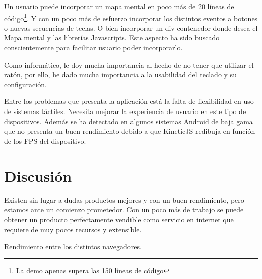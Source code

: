 Un usuario puede incorporar un mapa mental en poco más de 20 líneas de código\footnote{La demo apenas supera las 150 líneas de código}. Y con un poco más de esfuerzo incorporar los distintos eventos a botones o nuevas secuencias de teclas. O bien incorporar un div contenedor donde desea el Mapa mental y las librerías Javascripts. Este aspecto ha sido buscado conscientemente para facilitar usuario poder incorporarlo. 



Como informático, le doy mucha importancia al hecho de no tener que utilizar el ratón, por ello, he dado mucha importancia a la usabilidad del teclado y su configuración. 

Entre los problemas que presenta la aplicación está la falta de flexibilidad en uso de sistemas táctiles. Necesita mejorar la experiencia de usuario en este tipo de dispositivos. Además se ha detectado en algunos sistemas Android de baja gama que no presenta un buen rendimiento debido a que KineticJS redibuja en función de los FPS del dispositivo. 

\section{Discusión}

Existen sin lugar a dudas productos mejores y con un buen rendimiento, pero estamos ante un comienzo prometedor. Con un poco más de trabajo se puede obtener un producto perfectamente vendible como servicio en internet que requiere de muy pocos recursos y extensible. 

Rendimiento entre los distintos navegadores. 




